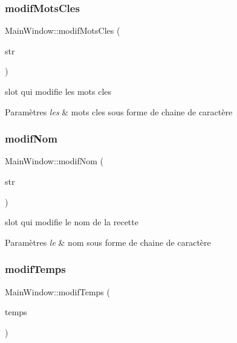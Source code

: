 \subsubsection{\texorpdfstring{modif\+Mots\+Cles}{modifMotsCles}}
{\footnotesize\ttfamily Main\+Window\+::modif\+Mots\+Cles (\begin{DoxyParamCaption}\item[{Q\+String}]{str }\end{DoxyParamCaption})\hspace{0.3cm}{\ttfamily [slot]}}



slot qui modifie les mots cles 


\begin{DoxyParams}{Paramètres}
{\em les} & mots cles sous forme de chaine de caractère \\
\hline
\end{DoxyParams}
\mbox{\label{classMainWindow_ac154b320efe8998a85a93f1c41ace7e4}} 
\subsubsection{\texorpdfstring{modif\+Nom}{modifNom}}
{\footnotesize\ttfamily Main\+Window\+::modif\+Nom (\begin{DoxyParamCaption}\item[{Q\+String}]{str }\end{DoxyParamCaption})\hspace{0.3cm}{\ttfamily [slot]}}



slot qui modifie le nom de la recette 


\begin{DoxyParams}{Paramètres}
{\em le} & nom sous forme de chaine de caractère \\
\hline
\end{DoxyParams}
\mbox{\label{classMainWindow_ab49cf9603a1a539ca19623eac88b86c2}} 
\subsubsection{\texorpdfstring{modif\+Temps}{modifTemps}}
{\footnotesize\ttfamily Main\+Window\+::modif\+Temps (\begin{DoxyParamCaption}\item[{Q\+String}]{temps }\end{DoxyParamCaption})\hspace{0.3cm}{\ttfamily [slot]}}



